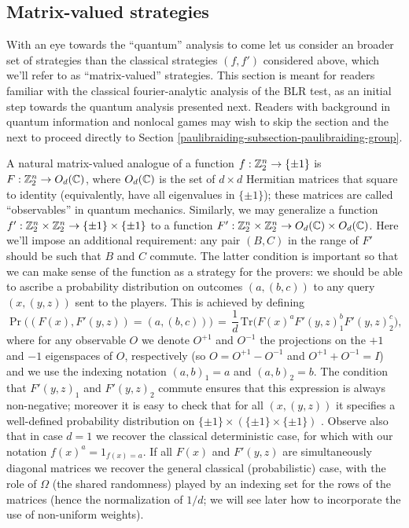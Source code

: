\subsection{Matrix-valued strategies}
\label{subsection-matrix-val-strat}

With an eye towards the ``quantum'' analysis to come let us consider an broader set of strategies than the classical strategies $(f,f')$ considered above, which we'll refer to as ``matrix-valued'' strategies. This section is meant for readers familiar with the classical fourier-analytic analysis of the BLR test, as an initial step towards the quantum analysis presented next. Readers with background in quantum information and nonlocal games may wish to skip the section and the next to proceed directly to Section \ref{paulibraiding-subsection-paulibraiding-group}. 

A natural matrix-valued analogue of a function $f:\mathbb{Z}_2^n \to \{\pm 1\}$ is $F:\mathbb{Z}_2^n \to O_d(\mathbb{C})$, where $O_d(\mathbb{C})$ is the set of $d\times d$ Hermitian matrices that square to identity (equivalently, have all eigenvalues in $\{\pm 1\}$); these matrices are called ``observables'' in quantum mechanics. Similarly, we may generalize a function  $f':\mathbb{Z}_2^n \times \mathbb{Z}_2^n \to \{\pm 1 \} \times \{\pm 1\}$ to a function  $F':\mathbb{Z}_2^n \times \mathbb{Z}_2^n \to O_d(\mathbb{C}) \times O_d(\mathbb{C})$. Here we'll impose an additional requirement: any pair $(B,C)$ in the range of $F'$ should be such that $B$ and $C$ commute. The latter condition is important so that we can make sense of the function as a strategy for the provers: we should be able to ascribe a probability distribution on outcomes $(a,(b,c))$ to any query $(x,(y,z))$ sent to the players. This is achieved by defining 
\begin{equation}\label{eq:matrixprob}
\Pr\big((F(x), F'(y,z))=(a,(b,c))\big)\,=\,\frac{1}{d}\,\mathrm{Tr}\big( F(x)^aF'(y,z)_1^b F'(y,z)_2^c\big),
\end{equation}
where for any observable $O$ we denote $O^{+1}$ and $O^{-1}$ the projections on the $+1$ and $-1$ eigenspaces of $O$, respectively (so $O=O^{+1}-O^{-1}$ and $O^{+1}+O^{-1}=I$) and we use the indexing notation $(a,b)_1=a$ and $(a,b)_2=b$. The condition that $F'(y,z)_1$ and $F'(y,z)_2$ commute ensures that this expression is always non-negative; moreover it is easy to check that for all $(x,(y,z))$ it specifies a well-defined probability distribution on $\{\pm 1\}\times (\{\pm1\}\times \{\pm1\})$ . Observe also that in case $d=1$ we recover the classical deterministic case, for which with our notation $f(x)^a = 1_{f(x)=a}$. If all $F(x)$ and $F'(y,z)$ are simultaneously diagonal matrices we recover the general classical (probabilistic) case, with the role of $\Omega$ (the shared randomness) played by an indexing set for the rows of the matrices (hence the normalization of $1/d$; we will see later how to incorporate the use of non-uniform weights). 


